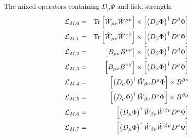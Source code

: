 The mixed operators containing $D_\mu\Phi$ and field strength:
\begin{eqnarray}
 {\cal L}_{M,0} &=&   \hbox{Tr}\left [ \hat{W}_{\mu\nu} \hat{W}^{\mu\nu} \right ]
\times  \left [ \left ( D_\beta \Phi \right)^\dagger
D^\beta \Phi \right ]
\\
 {\cal L}_{M,1} &=&   \hbox{Tr}\left [ \hat{W}_{\mu\nu} \hat{W}^{\nu\beta} \right ]
\times  \left [ \left ( D_\beta \Phi \right)^\dagger
D^\mu \Phi \right ]
\\
 {\cal L}_{M,2} &=&   \left [ B_{\mu\nu} B^{\mu\nu} \right ]
\times  \left [ \left ( D_\beta \Phi \right)^\dagger
D^\beta \Phi \right ]
\\
 {\cal L}_{M,3} &=&   \left [ B_{\mu\nu} B^{\nu\beta} \right ]
\times  \left [ \left ( D_\beta \Phi \right)^\dagger
D^\mu \Phi \right ]
\\
  {\cal L}_{M,4} &=& \left [ \left ( D_\mu \Phi \right)^\dagger \hat{W}_{\beta\nu}
 D^\mu \Phi  \right ] \times B^{\beta\nu}
\\
  {\cal L}_{M,5} &=& \left [ \left ( D_\mu \Phi \right)^\dagger \hat{W}_{\beta\nu}
 D^\nu \Phi  \right ] \times B^{\beta\mu}
\\
  {\cal L}_{M,6} &=& \left [ \left ( D_\mu \Phi \right)^\dagger \hat{W}_{\beta\nu}
\hat{W}^{\beta\nu} D^\mu \Phi  \right ] 
\\
  {\cal L}_{M,7} &=& \left [ \left ( D_\mu \Phi \right)^\dagger \hat{W}_{\beta\nu}
\hat{W}^{\beta\mu} D^\nu \Phi  \right ] 
\end{eqnarray}


